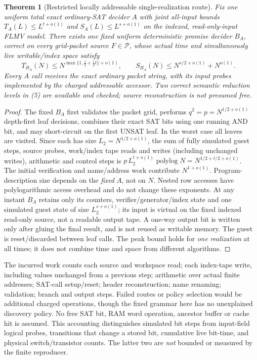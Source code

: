 \documentclass[11pt]{article}
\newtheorem{theorem}{Theorem}
\begin{document}
\begin{theorem}[Restricted locally addressable single-realization route]
Fix one uniform total exact ordinary-SAT decider \(A\) with
joint all-input bounds
\(T_A(L)\le L^{t+o(1)}\) and
\(S_A(L)\le L^{s+o(1)}\) on the indexed,
read-only-input FLMV model. There exists one fixed uniform
deterministic \emph{promise} decider \(B_A\), correct on every
grid-packet source \(F\in\mathcal P\), whose actual time
and simultaneously live writable/index space satisfy
\[
 \boxed{
 T_{B_A}(N)\le
 N^{\max\{1,\frac12+\frac12t\}+o(1)},\qquad
 S_{B_A}(N)\le
 N^{s/2+o(1)}+N^{o(1)}.}
\tag{6}
\]
Every \(A\) call receives the exact ordinary packet string,
with its input probes implemented by the charged addressable
accessor. Two correct semantic reduction levels in (5) are
available and checked; source reconstruction is not presumed
free.
\end{theorem}
\begin{proof}
The fixed \(B_A\) first validates the packet grid, performs
\(q^2=p=N^{1/2+o(1)}\) depth-first leaf decisions,
combines their exact SAT bits using one running AND bit,
and may short-circuit on the first UNSAT leaf. In the worst
case all leaves are visited. Since each has size
\(L_2=N^{1/2+o(1)}\), the sum of fully simulated guest
steps, source probes, work/index tape reads and writes
(including unchanged writes), arithmetic and control steps is
\(p\,L_2^{t+o(1)}\operatorname{polylog}N
=N^{1/2+t/2+o(1)}\).
The initial verification and name/address work contribute
\(N^{1+o(1)}\). Program-description size depends on the
\emph{fixed} \(A\), not on \(N\). Nested row accesses
have polylogarithmic access overhead and do not change
these exponents. At any instant \(B_A\) retains only its
counters, verifier/generator/index state and one simulated
guest state of size \(L_2^{s+o(1)}\);
its input is virtual on the fixed indexed read-only source,
not a readable output tape. A one-way output bit is written
only after gluing the final result, and is not reused as
writable memory. The guest is reset/discarded between leaf
calls. The peak bound holds for \emph{one realization} at
all times; it does not combine time and space from different
algorithms.
\end{proof}

The incurred work counts each source and workspace read;
each index-tape write, including values unchanged from a
previous step; arithmetic over actual finite addresses;
SAT-call setup/reset; header reconstruction; name
renaming; validation; branch and output steps. Failed
routes or policy selection would be additional charged
operations, though the fixed grammar here has no
unexplained discovery policy. No free SAT bit, RAM
word operation, ancestor buffer or cache hit is assumed.
This accounting distinguishes simulated bit steps from
input-field logical probes, transitions that change a
stored bit, cumulative live bit-time, and physical
switch/transistor counts. The latter two are
\emph{not} bounded or measured by the finite reproducer.
\end{document}

